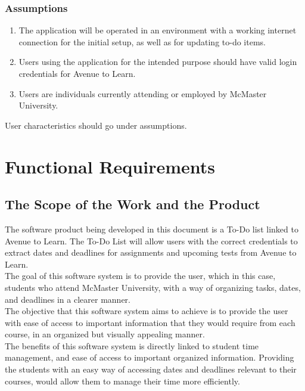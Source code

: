 \documentclass[12pt, titlepage]{article}
\begin{document}
\subsubsection{Assumptions}

\begin{enumerate}
\item The application will be operated in an environment with a working internet connection for the initial setup, as well as for updating to-do items.
\item Users using the application for the intended purpose should have valid login credentials for Avenue to Learn.
\item Users are individuals currently attending or employed by McMaster University.
\end{enumerate}

User characteristics should go under assumptions.

\section{Functional Requirements}

\subsection{The Scope of the Work and the Product}

The software product being developed in this document is a To-Do list linked to Avenue to Learn. The To-Do List will allow users with the correct credentials to extract dates and deadlines for assignments and upcoming tests from Avenue to Learn.\\

\noindent The goal of this software system is to provide the user, which in this case, students who attend McMaster University, with a way of organizing tasks, dates, and deadlines in a clearer manner.\\

\noindent The objective that this software system aims to achieve is to provide the user with ease of access to important information that they would require from each course, in an organized but visually appealing manner.\\

\noindent The benefits of this software system is directly linked to student time management, and ease of access to important organized information. Providing the students with an easy way of accessing dates and deadlines relevant to their courses, would allow them to manage their time more efficiently. \\
\end{document}
